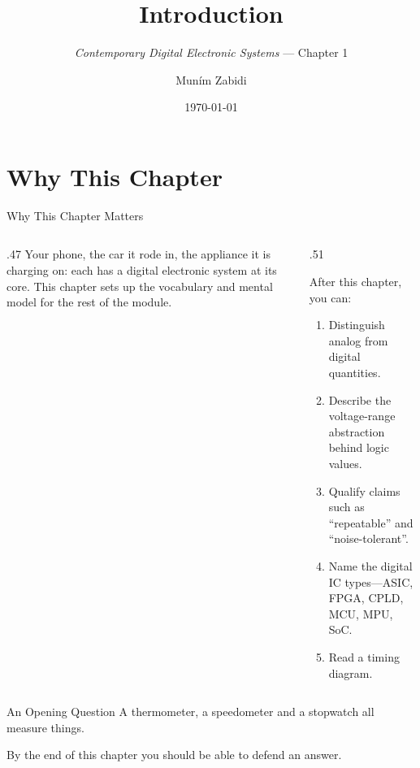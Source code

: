 \documentclass[9pt,aspectratio=169,xcolor=table]{beamer}
\title{Introduction}
\subtitle{\emph{Contemporary Digital Electronic Systems} --- Chapter 1}
\author{Mun\'{i}m Zabidi}
\institute{\color{primary}Faculty of Electrical Engineering, Universiti Teknologi Malaysia}
\date{\today}
\begin{document}
\titlepage

\section{Why This Chapter}

\begin{frame}{Why This Chapter Matters}
  \begin{columns}[c]
  \begin{column}{.47\textwidth}
    Your phone, the car it rode in, the appliance it is charging on: each has a \alert{digital electronic system} at its core. This chapter sets up the vocabulary and mental model for the rest of the module.
  \end{column}
  \begin{column}{.51\textwidth}
    \begin{block}{After this chapter, you can:}
    {\small
    \begin{enumerate}\itemsep2pt
      \item Distinguish analog from digital quantities.
      \item Describe the voltage-range abstraction behind logic values.
      \item Qualify claims such as ``repeatable'' and ``noise-tolerant''.
      \item Name the digital IC types---ASIC, FPGA, CPLD, MCU, MPU, SoC.
      \item Read a timing diagram.
    \end{enumerate}}
    \end{block}
  \end{column}
  \end{columns}
\end{frame}

\begin{frame}{An Opening Question}
  \leavevmode\vspace{4mm}
  A thermometer, a speedometer and a stopwatch all measure things.
  \vspace{4mm}
  \begin{center}
  \end{center}
  \vspace{4mm}
  By the end of this chapter you should be able to defend an answer.
\end{frame}
\end{document}
